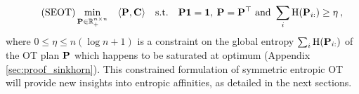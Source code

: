 \begin{equation}
\tag{SEOT}
\label{eq:entropy_constrained_OT}
\min_{\mathbf{P} \in \mathbb{R}_{+}^{n \times n}} \quad \langle \mathbf{P}, \mathbf{C} \rangle \quad \text{s.t.} \quad \mathbf{P} \bm{1} = \bm{1}, \: \mathbf{P} = \mathbf{P}^\top \text{ and } \sum_i \operatorname{H}(\mathbf{P}_{i:}) \geq \eta \:,
\end{equation}
where $0 \leq \eta \leq n (\log n + 1)$ is a constraint on the global entropy $\sum_i \operatorname{H}(\mathbf{P}_{i:})$ of the OT plan $\mathbf{P}$ which happens to be saturated at optimum (Appendix \ref{sec:proof_sinkhorn}). This constrained formulation of symmetric entropic OT will provide new insights into entropic affinities, as detailed in the next sections.





